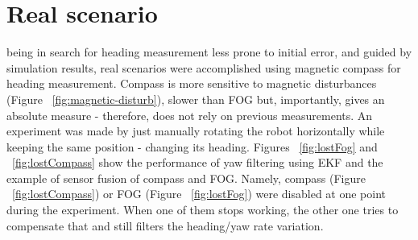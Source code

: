 \section{Real scenario}
 being in search for heading measurement less prone to initial error, and guided by simulation results, real scenarios were accomplished using magnetic compass for heading measurement. Compass is more sensitive to magnetic disturbances (Figure ~\ref{fig:magnetic-disturb}), slower than FOG but, importantly, gives an absolute measure - therefore, does not rely on previous measurements. An experiment was made by just manually rotating the robot horizontally while keeping the same position - changing its heading. Figures ~\ref{fig:lostFog} and ~\ref{fig:lostCompass} show the performance of yaw filtering using EKF and the example of sensor fusion of compass and FOG. Namely, compass (Figure ~\ref{fig:lostCompass}) or FOG (Figure ~\ref{fig:lostFog}) were disabled at one point during the experiment. When one of them stops working, the other one tries to compensate that and still filters the heading/yaw rate variation.  
\begin{figure}%
  \centering
     \\   
\end{figure}

